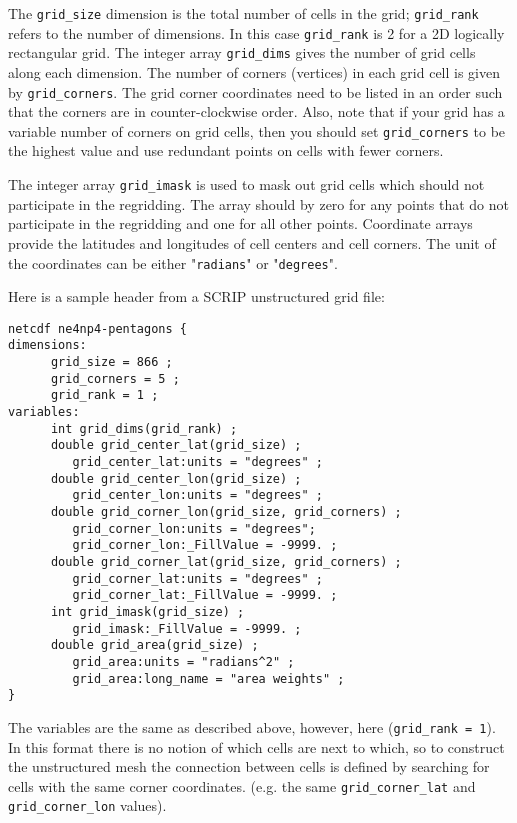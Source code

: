 The {\tt grid\_size} dimension is the total number of cells in the grid; {\tt grid\_rank} refers to the
number of dimensions. In this case {\tt grid\_rank} is 2 for a 2D logically rectangular grid.
The integer array {\tt grid\_dims} gives the number of grid cells along each dimension.
The number of corners (vertices) in each grid cell is given by {\tt grid\_corners}.
The grid corner coordinates need to be listed in an order such that the corners are in counter-clockwise
order.  Also, note that if your grid has a variable number of corners on grid cells, then
you should set {\tt grid\_corners} to be the highest value and use redundant points
on cells with fewer corners.

The integer array {\tt grid\_imask} is used to mask out grid cells which should
not participate in the regridding. The array should by zero for any points
that do not participate in the regridding and one for all other points.
Coordinate arrays provide the latitudes and longitudes of cell centers
and cell corners. The unit of the coordinates can be either "{\tt radians}" or "{\tt degrees}".

Here is a sample header from a SCRIP unstructured grid file:

\begin{verbatim}
netcdf ne4np4-pentagons {
dimensions:
      grid_size = 866 ;
      grid_corners = 5 ;
      grid_rank = 1 ;
variables:
      int grid_dims(grid_rank) ;
      double grid_center_lat(grid_size) ;
         grid_center_lat:units = "degrees" ;
      double grid_center_lon(grid_size) ;
         grid_center_lon:units = "degrees" ;
      double grid_corner_lon(grid_size, grid_corners) ;
         grid_corner_lon:units = "degrees";
         grid_corner_lon:_FillValue = -9999. ;
      double grid_corner_lat(grid_size, grid_corners) ;
         grid_corner_lat:units = "degrees" ;
         grid_corner_lat:_FillValue = -9999. ;
      int grid_imask(grid_size) ;
         grid_imask:_FillValue = -9999. ;
      double grid_area(grid_size) ;
         grid_area:units = "radians^2" ;
         grid_area:long_name = "area weights" ;
}
\end{verbatim}

The variables are the same as described above, however, here ({\tt grid\_rank = 1}). In this format there
is no notion of which cells are next to which, so to construct the unstructured mesh the connection between
cells is defined by searching for cells with the same corner coordinates. (e.g. the same {\tt grid\_corner\_lat}
and {\tt grid\_corner\_lon} values).

